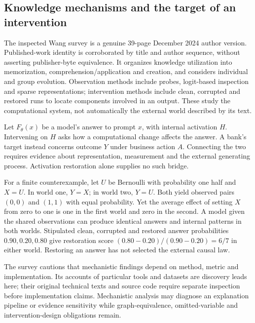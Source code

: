 \subsection{Knowledge mechanisms and the target of an intervention}
The inspected Wang survey is a genuine 39-page December 2024 author version. Published-work identity is corroborated by title and author sequence, without asserting publisher-byte equivalence. It organizes knowledge utilization into memorization, comprehension/application and creation, and considers individual and group evolution. Observation methods include probes, logit-based inspection and sparse representations; intervention methods include clean, corrupted and restored runs to locate components involved in an output. These study the computational system, not automatically the external world described by its text.\citep{exec24_knowledge_original}

Let $F_\theta(x)$ be a model's answer to prompt $x$, with internal activation $H$. Intervening on $H$ asks how a computational change affects the answer. A bank's target instead concerns outcome $Y$ under business action $A$. Connecting the two requires evidence about representation, measurement and the external generating process. Activation restoration alone supplies no such bridge.\citep{exec24_css_knowledge_reference}

For a finite counterexample, let $U$ be Bernoulli with probability one half and $X=U$. In world one, $Y=X$; in world two, $Y=U$. Both yield observed pairs $(0,0)$ and $(1,1)$ with equal probability. Yet the average effect of setting $X$ from zero to one is one in the first world and zero in the second. A model given the shared observations can produce identical answers and internal patterns in both worlds. Stipulated clean, corrupted and restored answer probabilities $0.90,0.20,0.80$ give restoration score $(0.80-0.20)/(0.90-0.20)=6/7$ in either world. Restoring an answer has not selected the external causal law.\citep{exec24_css_knowledge_reference}

The survey cautions that mechanistic findings depend on method, metric and implementation. Its accounts of particular tools and datasets are discovery leads here; their original technical texts and source code require separate inspection before implementation claims. Mechanistic analysis may diagnose an explanation pipeline or evidence sensitivity while graph-equivalence, omitted-variable and intervention-design obligations remain.\citep{exec24_knowledge_original,exec24_css_knowledge_reference}

